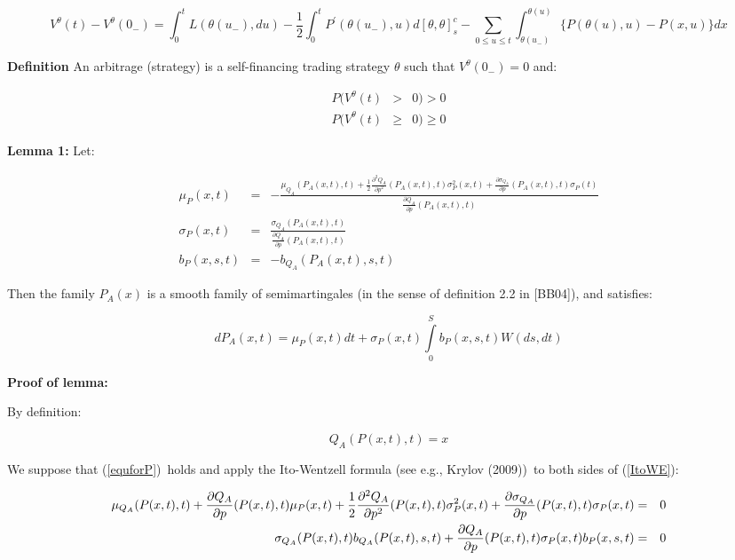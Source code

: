 \documentclass{article}
\begin{document}
\begin{equation}
V^{\theta }(t)-V^{\theta }(0_{-})=\int_{0}^{t}L(\theta (u_{-}),du)-\frac{1}{2%
}\int_{0}^{t}P^{\prime }(\theta (u_{-}),u)d[\theta ,\theta
]_{s}^{c}-\sum_{0\leq u\leq t}\int_{\theta (u_{-})}^{\theta (u)}\{P(\theta
(u),u)-P(x,u)\}dx  \label{lemma32BB04}
\end{equation}

\textbf{Definition} An arbitrage (strategy) is a self-financing trading
strategy $\theta $ such that $V^{\theta }(0_{-})=0$ and:

\begin{eqnarray*}
P(V^{\theta }(t) &>&0)>0 \\
P(V^{\theta }(t) &\geq &0)\geq 0
\end{eqnarray*}

\textbf{Lemma 1: } Let:

\begin{eqnarray*}
\mu _{P}(x,t) &=&-\frac{\mu _{Q_{A}}(P_{A}(x,t),t)+\frac{1}{2}\frac{\partial
^{2}Q_{A}}{\partial p^{2}}(P_{A}(x,t),t)\sigma _{P}^{2}(x,t)+\frac{\partial
\sigma _{Q_{A}}}{\partial p}(P_{A}(x,t),t)\sigma _{P}(t)}{\frac{\partial
Q_{A}}{\partial p}(P_{A}(x,t),t)} \\
\sigma _{P}(x,t) &=&\frac{\sigma _{Q_{A}}(P_{A}(x,t),t)}{\frac{\partial Q_{A}%
}{\partial p}(P_{A}(x,t),t)} \\
b_{P}(x,s,t) &=&-b_{Q_{A}}(P_{A}(x,t),s,t)
\end{eqnarray*}

Then the family $P_{A}(x)$ is a smooth family of semimartingales (in the
sense of definition 2.2 in [BB04]), and satisfies:

\begin{equation}
dP_{A}(x,t)=\mu _{P}(x,t)dt+\sigma
_{P}(x,t)\int\limits_{0}^{S}b_{P}(x,s,t)W(ds,dt)  \label{equforP}
\end{equation}%
\bigskip

\textbf{Proof of lemma:}

By definition:

\begin{equation}
Q_{A}(P(x,t),t)=x  \label{ItoWE}
\end{equation}

We suppose that (\ref{equforP})\ holds and apply the Ito-Wentzell formula
(see e.g., Krylov (2009))\ to both sides of (\ref{ItoWE}):

\begin{eqnarray*}
\mu _{Q_{A}}(P(x,t),t)+\frac{\partial Q_{A}}{\partial p}(P(x,t),t)\mu
_{P}(x,t)+\frac{1}{2}\frac{\partial ^{2}Q_{A}}{\partial p^{2}}%
(P(x,t),t)\sigma _{P}^{2}(x,t)+\frac{\partial \sigma _{Q_{A}}}{\partial p}%
(P(x,t),t)\sigma _{P}(x,t) &=&0 \\
\sigma _{Q_{A}}(P(x,t),t)b_{Q_{A}}(P(x,t),s,t)+\frac{\partial Q_{A}}{%
\partial p}(P(x,t),t)\sigma _{P}(x,t)b_{P}(x,s,t) &=&0
\end{eqnarray*}
\end{document}
